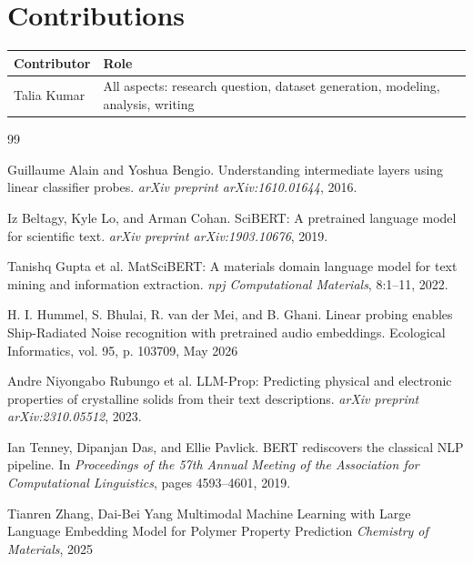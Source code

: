 \documentclass[11pt]{article}
\begin{document}
\section*{Contributions}

\begin{tabular}{ll}
\toprule
\textbf{Contributor} & \textbf{Role} \\
\midrule
Talia Kumar & All aspects: research question, dataset generation, modeling, analysis, writing \\
\bottomrule
\end{tabular}


\begin{thebibliography}{99}

Guillaume Alain and Yoshua Bengio.
\newblock Understanding intermediate layers using linear classifier probes.
\newblock \textit{arXiv preprint arXiv:1610.01644}, 2016.

Iz Beltagy, Kyle Lo, and Arman Cohan.
\newblock SciBERT: A pretrained language model for scientific text.
\newblock \textit{arXiv preprint arXiv:1903.10676}, 2019.

Tanishq Gupta et al.
\newblock MatSciBERT: A materials domain language model for text mining and information extraction.
\newblock \textit{npj Computational Materials}, 8:1--11, 2022.

H. I. Hummel, S. Bhulai, R. van der Mei, and B. Ghani.
\newblock Linear probing enables Ship-Radiated Noise recognition with pretrained audio embeddings.
\newblock Ecological Informatics, vol. 95, p. 103709, May 2026

Andre Niyongabo Rubungo et al.
\newblock LLM-Prop: Predicting physical and electronic properties of crystalline solids from their text descriptions.
\newblock \textit{arXiv preprint arXiv:2310.05512}, 2023.

Ian Tenney, Dipanjan Das, and Ellie Pavlick.
\newblock BERT rediscovers the classical NLP pipeline.
\newblock In \textit{Proceedings of the 57th Annual Meeting of the Association for Computational Linguistics}, pages 4593--4601, 2019.

Tianren Zhang, Dai-Bei Yang
\newblock Multimodal Machine Learning with Large Language Embedding Model for Polymer Property Prediction
\newblock \textit{Chemistry of Materials}, 2025

\end{thebibliography}
\end{document}
